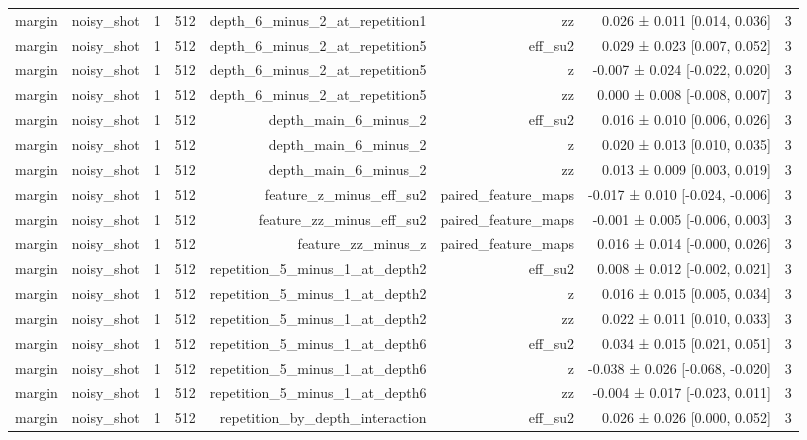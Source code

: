 \begin{table}
\begin{tabular}{lrrrrrrr}
margin & noisy\_shot & 1 & 512 & depth\_6\_minus\_2\_at\_repetition1 & zz & 0.026 ± 0.011 [0.014, 0.036] & 3 \\
margin & noisy\_shot & 1 & 512 & depth\_6\_minus\_2\_at\_repetition5 & eff\_su2 & 0.029 ± 0.023 [0.007, 0.052] & 3 \\
margin & noisy\_shot & 1 & 512 & depth\_6\_minus\_2\_at\_repetition5 & z & -0.007 ± 0.024 [-0.022, 0.020] & 3 \\
margin & noisy\_shot & 1 & 512 & depth\_6\_minus\_2\_at\_repetition5 & zz & 0.000 ± 0.008 [-0.008, 0.007] & 3 \\
margin & noisy\_shot & 1 & 512 & depth\_main\_6\_minus\_2 & eff\_su2 & 0.016 ± 0.010 [0.006, 0.026] & 3 \\
margin & noisy\_shot & 1 & 512 & depth\_main\_6\_minus\_2 & z & 0.020 ± 0.013 [0.010, 0.035] & 3 \\
margin & noisy\_shot & 1 & 512 & depth\_main\_6\_minus\_2 & zz & 0.013 ± 0.009 [0.003, 0.019] & 3 \\
margin & noisy\_shot & 1 & 512 & feature\_z\_minus\_eff\_su2 & paired\_feature\_maps & -0.017 ± 0.010 [-0.024, -0.006] & 3 \\
margin & noisy\_shot & 1 & 512 & feature\_zz\_minus\_eff\_su2 & paired\_feature\_maps & -0.001 ± 0.005 [-0.006, 0.003] & 3 \\
margin & noisy\_shot & 1 & 512 & feature\_zz\_minus\_z & paired\_feature\_maps & 0.016 ± 0.014 [-0.000, 0.026] & 3 \\
margin & noisy\_shot & 1 & 512 & repetition\_5\_minus\_1\_at\_depth2 & eff\_su2 & 0.008 ± 0.012 [-0.002, 0.021] & 3 \\
margin & noisy\_shot & 1 & 512 & repetition\_5\_minus\_1\_at\_depth2 & z & 0.016 ± 0.015 [0.005, 0.034] & 3 \\
margin & noisy\_shot & 1 & 512 & repetition\_5\_minus\_1\_at\_depth2 & zz & 0.022 ± 0.011 [0.010, 0.033] & 3 \\
margin & noisy\_shot & 1 & 512 & repetition\_5\_minus\_1\_at\_depth6 & eff\_su2 & 0.034 ± 0.015 [0.021, 0.051] & 3 \\
margin & noisy\_shot & 1 & 512 & repetition\_5\_minus\_1\_at\_depth6 & z & -0.038 ± 0.026 [-0.068, -0.020] & 3 \\
margin & noisy\_shot & 1 & 512 & repetition\_5\_minus\_1\_at\_depth6 & zz & -0.004 ± 0.017 [-0.023, 0.011] & 3 \\
margin & noisy\_shot & 1 & 512 & repetition\_by\_depth\_interaction & eff\_su2 & 0.026 ± 0.026 [0.000, 0.052] & 3 \\

\end{tabular}
\end{table}

